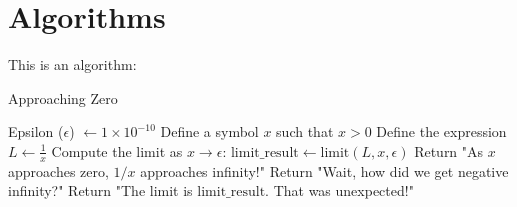 \section{Algorithms}
This is an algorithm: 

\begin{algorithm}
\caption{Approaching Zero}\label{alg:approaching_zero}
\begin{algorithmic}[1]
\Require Epsilon ($\epsilon$) $\gets 1 \times 10^{-10}$
\State Define a symbol $x$ such that $x > 0$
\State Define the expression $L \gets \frac{1}{x}$
\State Compute the limit as $x \to \epsilon$: $\text{limit\_result} \gets \text{limit}(L, x, \epsilon)$
    \State Return "As $x$ approaches zero, $1/x$ approaches infinity!"
    \State Return "Wait, how did we get negative infinity?"
\Else
    \State Return "The limit is $\text{limit\_result}$. That was unexpected!"
\EndIf
\end{algorithmic}
\end{algorithm}


